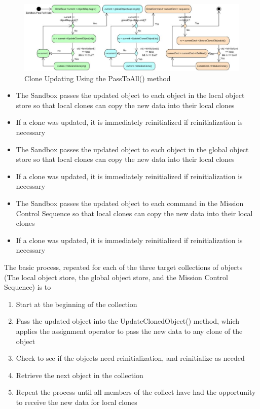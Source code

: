 \documentclass[10pt,letterpaper]{article}
\begin{document}
\begin{figure}[htb]
\begin{center}
\includegraphics[scale=0.5]{Images/SandboxClonePassToAll.eps}
\caption{\label{figure:PassToAllDetails}Clone Updating Using the PassToAll() method}
\end{center}
\end{figure}

\begin{itemize}
\item The Sandbox passes the updated object to each object in the local object store so that local clones can copy the new data into their local clones
\item If a clone was updated, it is immediately reinitialized if reinitialization is necessary
\item The Sandbox passes the updated object to each object in the global object store so that local clones can copy the new data into their local clones
\item If a clone was updated, it is immediately reinitialized if reinitialization is necessary
\item The Sandbox passes the updated object to each command in the Mission Control Sequence so that local clones can copy the new data into their local clones
\item If a clone was updated, it is immediately reinitialized if reinitialization is necessary
\end{itemize}

\noindent The basic process, repeated for each of the three target collections of objects (The local object store, the global object store, and the Mission Control Sequence) is to

\begin{enumerate}
\item Start at the beginning of the collection
\item Pass the updated object into the UpdateClonedObject() method, which applies the assignment operator to pass the new data to any clone of the object
\item Check to see if the objects need reinitialization, and reinitialize as needed
\item Retrieve the next object in the collection
\item Repeat the process until all members of the collect have had the opportunity to receive the new data for local clones
\end{enumerate}
\end{document}
